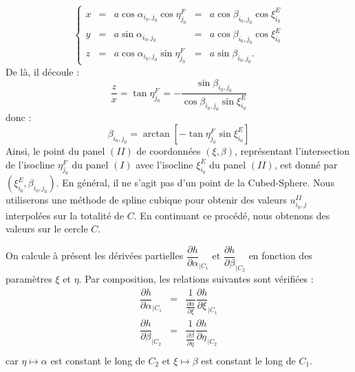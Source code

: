 \begin{equation}
\left\lbrace
\begin{array}{rcccl}
x & = & a \cos \alpha_{i_0, j_0} \cos \eta^F_{j_0} & = & a \cos \beta_{i_0, j_0} \cos \xi^E_{i_0} \\
y & = & a \sin \alpha_{i_0, j_0} & = & a \cos \beta_{i_0, j_0} \cos \xi^E_{i_0} \\
z & = & a \cos \alpha_{i_0, j_0} \sin \eta^F_{j_0}  & = & a \sin \beta_{i_0, j_0}.
\end{array}
\right.
\end{equation}
De là, il découle :
\begin{equation}
\dfrac{z}{x} = \tan \eta^F_{j_0} = - \dfrac{\sin \beta_{i_0, j_0}}{\cos \beta_{i_0, j_0} \sin \xi^E_{i_0}}
\end{equation}
donc :
\begin{equation}
\beta_{i_0, j_0} = \arctan \left[ - \tan \eta^F_{j_0} \sin \xi^E_{i_0} \right]
\label{eq:coord_cross}
\end{equation}
Ainsi, le point du panel $(II)$ de coordonnées $(\xi, \beta)$, représentant l'intersection de l'isocline $\eta^F_{j_0}$ du panel $(I)$ avec l'isocline $\xi_{i_0}^E$ du panel $(II)$, est donné par $(\xi^E_{i_0}, \beta_{i_0, j_0})$. En général, il ne s'agit pas d'un point de la Cubed-Sphere. Nous utiliserons une méthode de spline cubique pour obtenir des valeurs $u_{i_0,j}^{II}$ interpolées sur la totalité de $C$.
En continuant ce procédé, nous obtenons des valeurs sur le cercle $C$.







On calcule à présent les dérivées partielles $\dfrac{\partial h}{\partial \alpha}_{|C_1}$ et $\dfrac{\partial h}{\partial \beta}_{|C_2}$ en fonction des paramètres $\xi$ et $\eta$. Par composition, les relations suivantes sont vérifiées :
\begin{equation}
\begin{array}{rcl}
\dfrac{\partial h}{\partial \alpha}_{|C_1} & = &  \dfrac{1}{\frac{\partial \alpha}{\partial \xi}} \dfrac{\partial h}{\partial \xi}_{|C_1} \\
\dfrac{\partial h}{\partial \beta}_{|C_2} & = &  \dfrac{1}{\frac{\partial \beta}{\partial \eta}} \dfrac{\partial h}{\partial \eta}_{|C_2} \\
\end{array}
\label{eq: derivee partiel link}
\end{equation}
car $\eta \mapsto \alpha$ est constant le long de $C_2$ et $\xi \mapsto \beta$ est constant le long de $C_1$. 






